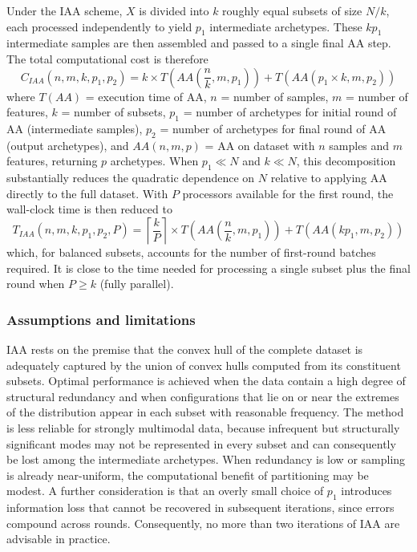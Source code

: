 \documentclass{WileyMSP-template}
\newcommand{\revision}[1]{{\color{red}#1}}
\begin{document}
Under the IAA scheme, $X$ is divided into $k$ roughly equal subsets of size $N/k$, each processed independently to yield $p_1$ intermediate archetypes. These $k p_1$ intermediate samples are then assembled and passed to a single final AA step. The total \revision{computational cost} is therefore
\begin{equation} \label{eq:IAAtotalComputationalCost}
C_{IAA}(n, m, k, p_1, p_2) = k \times T\left( AA\left( \frac{n}{k}, m, p_1 \right) \right) + T\left( AA\left( p_1 \times k, m, p_2 \right) \right)
\end{equation}
where $T(AA)$ = execution time of AA, $n$ = number of samples, $m$ = number of features, $k$ = number of subsets, $p_1$ = number of archetypes for initial round of AA (intermediate samples), $p_2$ = number of archetypes for final round of AA (output archetypes), and $AA(n, m, p)$ = AA on dataset with $n$ samples and $m$ features, returning $p$ archetypes. When $p_1 \ll N$ and $k \ll N$, this decomposition substantially reduces the quadratic dependence on $N$ relative to applying AA directly to the full dataset. \revision{With $P$ processors available for the first round, the wall-clock time is then reduced to
\begin{equation} \label{eq:IAAtotalWallTime}
T_{IAA}(n, m, k, p_1, p_2, P) = \left\lceil\frac{k}{P}\right\rceil \times T(AA(\frac{n}{k} , m, p_1)) + T(AA(kp_1, m, p_2))
\end{equation}
which, for balanced subsets, accounts for the number of first-round batches required. It is close to the time needed for processing a single subset plus the final round when $P \geq k$ (fully parallel).}

\subsubsection{Assumptions and limitations}
IAA rests on the premise that the convex hull of the complete dataset is adequately captured by the union of convex hulls computed from its constituent subsets. Optimal performance is achieved when the data contain a high degree of structural redundancy and when configurations that lie on or near the extremes of the distribution appear in each subset with reasonable frequency. The method is less reliable for strongly multimodal data, because infrequent but structurally significant modes may not be represented in every subset and can consequently be lost among the intermediate archetypes. When redundancy is low or sampling is already near-uniform, the computational benefit of partitioning may be modest. A further consideration is that an overly small choice of $p_1$ introduces information loss that cannot be recovered in subsequent iterations, since errors compound across rounds. Consequently, no more than two iterations of IAA are advisable in practice.
\end{document}
